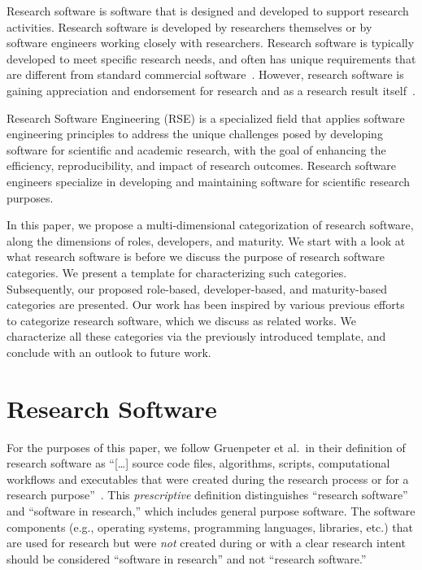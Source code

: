 \documentclass{IEEEcsmag}
\begin{document}
\chapteri Research software is software that is designed and developed to support research activities. 
Research software is developed by researchers themselves or by software engineers working closely with researchers.
Research software is typically developed to meet specific research needs, and often has unique requirements that are different from standard commercial software~\cite{CiSE2018}.
However, research software is gaining appreciation and endorsement for research and as a research result itself~\cite{JayEtAl2021,AnztEtAl2021}.

Research Software Engineering (RSE) is a specialized field that applies software engineering principles to address the unique challenges posed by developing software for scientific and academic research, with the goal of enhancing the efficiency, reproducibility, and impact of research outcomes. Research software engineers specialize in developing and maintaining software for scientific research purposes. 

In this paper, we propose a multi-dimensional categorization of research software, along the dimensions of roles, developers, and maturity.
We start with a look at what research software is before we discuss the purpose of research software categories. We present a template for characterizing such categories. Subsequently, our proposed role-based, developer-based, and maturity-based categories are presented.
Our work has been inspired by various previous efforts to categorize research software, which we discuss as related works. We characterize all these categories via the previously introduced template, and conclude with an outlook to future work.

\section{Research Software}

For the purposes of this paper, we follow Gruenpeter et al.\ in their definition of research software
as ``[\ldots] source code files, algorithms, scripts, computational workflows and executables that were created during the research process or for a research purpose''~\cite{GruenpeterEtAl2021}. 
This \textit{prescriptive} definition distinguishes ``research software'' and ``software in research,'' which includes general purpose software.
The software components (e.g., operating systems, programming languages, libraries, etc.) that are used for research but were \emph{not} created during or with a clear research intent should be considered ``software in research'' and not ``research software.''
\end{document}
